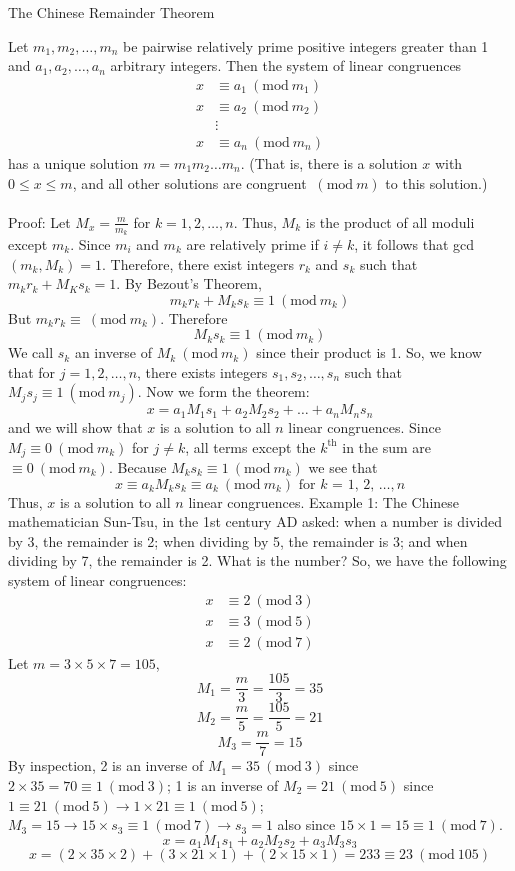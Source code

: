 \documentclass[12pt]{article}
\newcommand{\Mod}[1] {\ (\text{mod}\ #1)}
\begin{document}
\begin{center} The Chinese Remainder Theorem \end{center}  
Let $m_1, m_2, \dots, m_n$ be pairwise relatively prime positive integers greater than 1 and $a_1, a_2, \dots, a_n$ arbitrary integers. Then the system of linear congruences 
$$\begin{aligned} x &\equiv a_1 \Mod{m_1} \\ x &\equiv a_2 \Mod{m_2} \\  & \vdots \\ x &\equiv a_n \Mod{m_n} \end{aligned} $$ 
has a unique solution $m = m_1m_2\dots m_n$. (That is, there is a solution $x$ with $0 \leq x \leq m$, and all other solutions are congruent $\Mod{m}$ to this solution.) \\~\\
Proof: Let $M_x = \frac{m}{m_k}$ for $k = 1, 2, \dots, n$. Thus, $M_k$ is the product of all moduli except $m_k$. Since $m_i$ and $m_k$ are relatively prime if $i \neq k$, it follows that gcd $(m_k, M_k) = 1$. Therefore, there exist integers $r_k$ and $s_k$ such that $m_kr_k + M_Ks_k = 1$. By Bezout's Theorem, $$m_kr_k + M_ks_k \equiv 1 \Mod{m_k}$$ But $m_kr_k \equiv \Mod{m_k}$. Therefore $$M_ks_k \equiv 1 \Mod{m_k}$$ We call $s_k$ an inverse of $M_k \Mod{m_k}$ since their product is 1. So, we know that for $j = 1, 2, \dots, n$, there exists integers $s_1, s_2, \dots, s_n$ such that $M_js_j \equiv 1 \Mod{m_j}$. Now we form the theorem: $$x = a_1M_1s_1 + a_2M_2s_2 + \dots + a_nM_ns_n$$ and we will show that $x$ is a solution to all $n$ linear congruences. Since $M_j \equiv 0 \Mod{m_k}$ for $j \neq k$, all terms except the $k^\text{th}$ in the sum are $\equiv 0 \Mod{m_k}$. Because $M_ks_k \equiv 1 \Mod{m_k}$ we see that $$x \equiv a_kM_ks_k \equiv a_k \Mod{m_k} \text{ for $k$ = 1, 2, $\dots, n$}$$ Thus, $x$ is a solution to all $n$ linear congruences. \newpage
Example 1: The Chinese mathematician Sun-Tsu, in the 1st century AD asked: when a number is divided by 3, the remainder is 2; when dividing by 5, the remainder is 3; and when dividing by 7, the remainder is 2. What is the number? \newline So, we have the following system of linear congruences: $$\begin{aligned} x &\equiv 2 \Mod{3} \\ x &\equiv 3 \Mod{5} \\ x &\equiv 2 \Mod{7} \end{aligned} $$ Let $m = 3 \times 5 \times 7 = 105$, $$M_1 = \frac{m}{3} = \frac{105}{3} = 35$$ $$M_2 = \frac{m}{5} = \frac{105}{5} = 21 $$ $$M_3 = \frac{m}{7} = 15$$ By inspection, 2 is an inverse of $M_1 = 35 \Mod{3}$ since $2 \times 35 = 70 \equiv 1 \Mod{3}$; 1 is an inverse of $M_2 = 21 \Mod{5}$ since $1 \equiv 21 \Mod{5} \rightarrow 1 \times 21 \equiv 1 \Mod{5}$; $M_3 = 15 \rightarrow 15\times s_3 \equiv 1 \Mod{7} \rightarrow s_3 = 1$ also since $15\times 1 = 15 \equiv 1 \Mod{7}$. $$x = a_1M_1s_1 + a_2M_2s_2 + a_3M_3s_3$$ $$x = (2\times35\times2)+(3\times21\times1)+(2\times15\times1) = 233 \equiv 23 \Mod{105} $$ 
\end{document}
